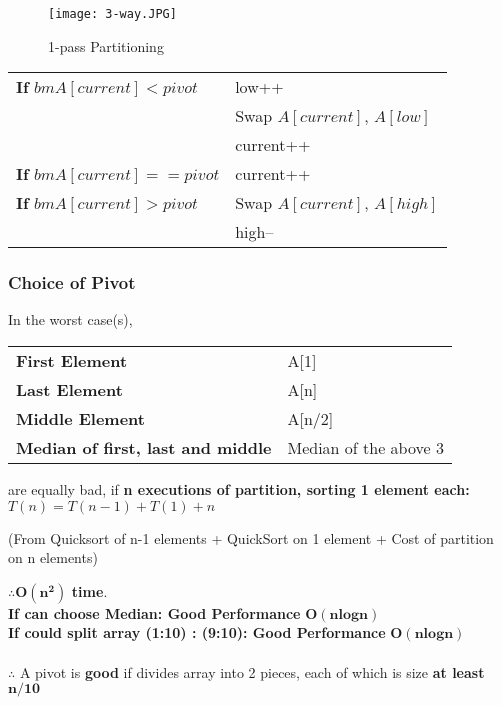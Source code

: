 \documentclass{article}
\begin{document}
    \begin{figure}[htbp]
        \begin{center}
        \texttt{[image: 3-way.JPG]}
        \caption{1-pass Partitioning}
        \label{1pass}
        \end{center}
    \end{figure}

    \begin{tabular}{ll}
        \textbf{ If }$bm{A[current] < pivot}$ & low++\\
        & Swap $A[current]$, $A[low]$\\
        & current++\\
        \textbf{ If} $bm{A[current] == pivot}$ & current++\\
        \textbf{ If} $bm{A[current] > pivot}$ & Swap $A[current]$, $A[high]$ \\
        & high--\\
    \end{tabular}

    \subsubsection{Choice of Pivot}
    In the worst case(s),
    
    \noindent\begin{tabular}{ll}
        \textbf{First Element} & A[1]\\
        \textbf{Last Element} & A[n]\\
        \textbf{Middle Element} & A[n/2]\\
        \textbf{Median of first, last and middle} & Median of the above 3\\
    \end{tabular}
    
    \noindent are equally bad, if \textbf{n executions of partition, sorting 1 element each: }\\
    
    $T(n) = T(n-1) + T(1) + n$
    
    (From Quicksort of n-1 elements + QuickSort on 1 element + Cost of partition on n elements)

    $\bm{\therefore O(n^{2})}$ \textbf{time}.\\

    \noindent\textbf{If can choose Median: Good Performance }$\bm{O(nlogn)}$\\
    
    \noindent\textbf{If could split array (1:10) : (9:10): Good Performance }$\bm{O(nlogn)}$\\\\
    $\therefore$ A pivot is \textbf{good} if divides array into 2 pieces, each of which is size \textbf{at least} $\bm{n/10}$
\end{document}
